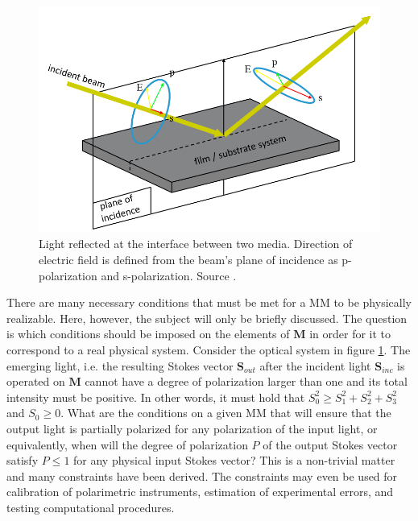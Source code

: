 \begin{figure}
    \centering
    \includegraphics[scale=0.75]{figures/Ch2/principle_of_ellipsometry.png}
    \caption{Light reflected at the interface between two media. Direction of electric field is defined from the beam's plane of incidence as p-polarization and s-polarization. Source \cite{ellipsometry_fig}.}
    \label{fig:principle_of_ellipsometry}
\end{figure}

There are many necessary conditions that must be met for a MM to be physically realizable\cite{hans_arwin}\cite{realizableMM}. Here, however, the subject will only be briefly discussed. The question is which conditions should be imposed on the elements of $\mathbf{M}$ in order for it to correspond to a real physical system. Consider the optical system in figure \ref{fig:principle_of_ellipsometry}. The emerging light, i.e. the resulting Stokes vector $\mathbf{S}_{out}$ after the incident light $\mathbf{S}_{inc}$ is operated on  $\mathbf{M}$ cannot have a degree of polarization larger than one and its total intensity must be positive. In other words, it must hold that $S_0^2 \geq S_1^2+S_2^2+S_3^2$ and $S_0 \geq 0$. What are the conditions on a given MM that will ensure that the output light is partially polarized for any polarization of the input light, or equivalently, when will the degree of polarization $P$ of the output Stokes vector satisfy $P\leq1$ for any physical input Stokes vector? This is a non-trivial matter and many constraints have been derived\cite{realizableMM}\cite{Kostinski:93}. The constraints may even be used for calibration of polarimetric instruments, estimation of experimental errors, and testing computational procedures.

